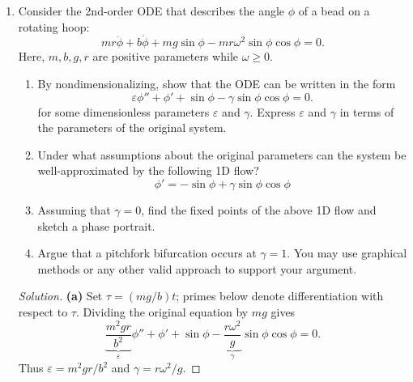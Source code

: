 \documentclass[10pt]{amsart}
\newenvironment{solution}
{\begin{proof}[Solution]}
{\end{proof}}
\begin{document}
\begin{enumerate}[label=\arabic*), leftmargin=*, itemsep=1em]
\begin{solution}
\begin{center}\quad\qedhere\end{center}
    \end{solution}

    \item Consider the 2nd-order ODE that describes the angle $\phi$ of a bead on a rotating hoop:
    \[
        mr\ddot{\phi}+b\dot{\phi}+mg\sin\phi-mr\omega^2\sin\phi\cos\phi=0.
    \]
    Here, $m,b,g,r$ are positive parameters while $\omega\geq 0$.
    \begin{enumerate}[label=(\alph*)]
        \item By nondimensionalizing, show that the ODE can be written in the form
        \[
            \varepsilon\phi''+\phi'+\sin\phi-\gamma\sin\phi\cos\phi=0.
        \]
        for some dimensionless parameters $\varepsilon$ and $\gamma$. Express $\varepsilon$ and $\gamma$ in terms of the parameters of the original system.
        \item Under what assumptions about the original parameters can the system be well-approximated by the following 1D flow?
        \[
            \phi'=-\sin\phi+\gamma\sin\phi\cos\phi
        \]
        \item Assuming that $\gamma=0$, find the fixed points of the above 1D flow and sketch a phase portrait.
        \item Argue that a pitchfork bifurcation occurs at $\gamma=1$. You may use graphical methods or any other valid approach to support your argument.
    \end{enumerate}

    \begin{solution}

\textbf{(a)} Set $\tau=(mg/b)t$; primes below denote differentiation with respect to $\tau$. Dividing the original equation by $mg$ gives
\[
\underbrace{\frac{m^2gr}{b^2}}_{\varepsilon}\phi''+\phi'+\sin\phi-
\underbrace{\frac{r\omega^2}{g}}_{\gamma}\sin\phi\cos\phi=0.
\]
Thus $\varepsilon=m^2gr/b^2$ and $\gamma=r\omega^2/g$.


\end{solution}
\end{enumerate}
\end{document}
